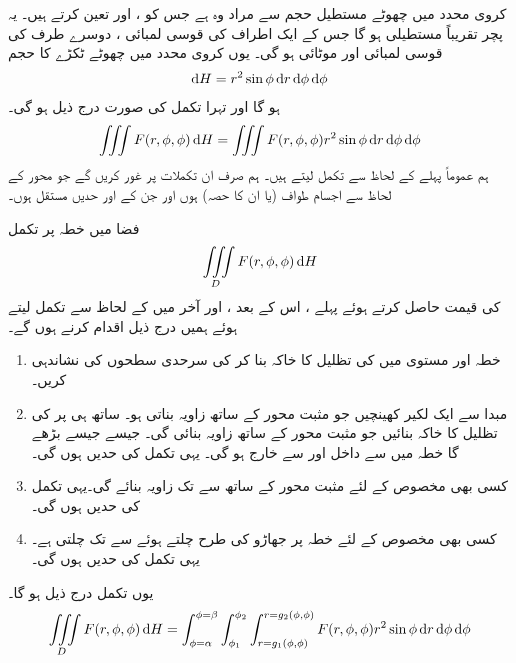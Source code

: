کروی محدد میں  چھوٹے مستطیل حجم  سے  مراد  وہ    ہے جس کو ،  اور  تعین کرتے ہیں۔ یہ پچر تقریباً مستطیلی ہو گا جس کے ایک اطراف  کی  قوسی لمبائی  ، دوسرے طرف کی قوسی لمبائی   اور موٹائی   ہو گی۔ یوں   کروی محدد میں چھوٹے ٹکڑے کا حجم 
\begin{align}
\dif H=r^2\sin\phi \dif r\dif \phi\dif \phi
\end{align}
ہو گا اور تہرا تکمل کی صورت درج ذیل ہو گی۔
\begin{align*}
\iiint F(r,\phi,\phi)\dif H=\iiint F(r,\phi,\phi) r^2\sin\phi\dif r \dif \phi\dif \phi
\end{align*}
ہم عموماً پہلے  کے لحاظ سے تکمل لیتے ہیں۔ ہم  صرف ان تکملات  پر غور کریں گے  جو  محور کے لحاظ سے اجسام طواف  (یا ان کا حصہ) ہوں اور جن کے  اور  حدیں مستقل ہوں۔

فضا میں خطہ  پر تکمل
\begin{align*}
\iiint\limits_D F(r,\phi,\phi)\dif H
\end{align*}
کی قیمت حاصل کرتے ہوئے  پہلے ، اس کے بعد ، اور آخر میں  کے لحاظ سے تکمل لیتے ہوئے ہمیں درج ذیل اقدام کرنے ہوں گے۔
\begin{enumerate}[1.]
\item
{}\quad
خطہ  اور مستوی  میں  کی تظلیل   کا خاکہ بنا کر  کی سرحدی سطحوں کی نشاندہی کریں۔
\item
{}\quad
مبدا سے ایک لکیر  کھینچیں جو مثبت محور  کے ساتھ زاویہ  بناتی ہو۔ ساتھ ہی  پر  کی تظلیل  کا خاکہ بنائیں جو مثبت  محور کے ساتھ زاویہ  بنائی گی۔ جیسے جیسے  بڑھے گا  خطہ  میں  سے داخل اور  سے خارج ہو گی۔ یہی تکمل کی  حدیں ہوں گی۔
\item
{}\quad
کسی بھی مخصوص  کے لئے   مثبت محور  کے ساتھ  سے  تک زاویہ بنائے گی۔یہی تکمل کی  حدیں ہوں گی۔
\item
{}\quad
کسی بھی مخصوص  کے لئے   خطہ  پر جھاڑو کی طرح چلتے ہوئے  سے  تک چلتی ہے۔  یہی تکمل کی  حدیں ہوں گی۔
\end{enumerate}
یوں تکمل درج ذیل ہو گا۔
\begin{align*}
\iiint\limits_D F(r,\phi,\phi)\dif H=\int_{\phi=\alpha}^{\phi=\beta}\int_{\phi_1}^{\phi_2}\int_{r=g_1(\phi,\phi)}^{r=g_2(\phi,\phi)} F(r,\phi,\phi) r^2\sin\phi \dif r\dif \phi \dif \phi
\end{align*} 

